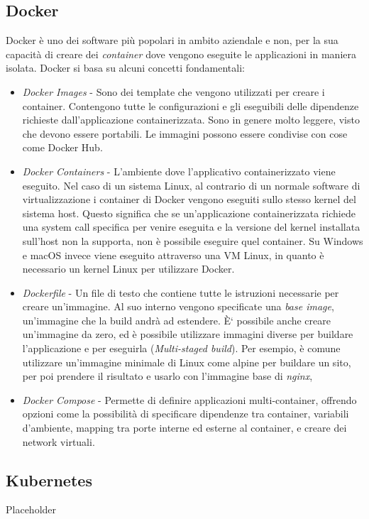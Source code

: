\subsection{Docker}
Docker \`e uno dei software pi\`u popolari in ambito aziendale e non, per la sua capacit\`a di creare dei \textit{container} dove vengono eseguite le applicazioni in maniera isolata.
Docker si basa su alcuni concetti fondamentali:
\begin{itemize}
  \item \textit{Docker Images} - Sono dei template che vengono utilizzati per creare i container. Contengono tutte le configurazioni e gli eseguibili delle dipendenze richieste
    dall'applicazione containerizzata. Sono in genere molto leggere, visto che devono essere portabili. Le immagini possono essere condivise con cose come Docker Hub.
  \item \textit{Docker Containers} - L'ambiente dove l'applicativo containerizzato viene eseguito. Nel caso di un sistema Linux, al contrario di un normale software di virtualizzazione
    i container di Docker vengono eseguiti sullo stesso kernel del sistema host. Questo significa che se un'applicazione containerizzata richiede una system call specifica
    per venire eseguita e la versione del kernel installata sull'host non la supporta, non \`e possibile eseguire quel container. Su Windows e macOS invece viene eseguito
    attraverso una VM Linux, in quanto \`e necessario un kernel Linux per utilizzare Docker.
  \item \textit{Dockerfile} - Un file di testo che contiene tutte le istruzioni necessarie per creare un'immagine. Al suo interno vengono specificate una \textit{base image},
    un'immagine che la build andr\`a ad estendere. \`E` possibile anche creare un'immagine da zero, ed \`e possibile utilizzare immagini diverse per buildare l'applicazione e per eseguirla
    (\textit{Multi-staged build}). Per esempio, \`e comune utilizzare un'immagine minimale di Linux come alpine per buildare un sito, per poi prendere il risultato e usarlo con
    l'immagine base di \textit{nginx},
  \item \textit{Docker Compose} - Permette di definire applicazioni multi-container, offrendo opzioni come la possibilit\`a di specificare dipendenze tra container, variabili d'ambiente,
    mapping tra porte interne ed esterne al container, e creare dei network virtuali.
\end{itemize}

\subsection{Kubernetes}
Placeholder

